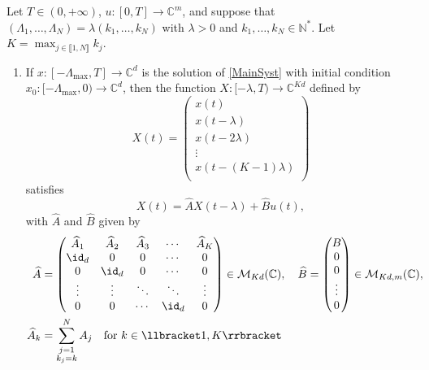 \begin{lemm}
\label{LemmAAugm}
Let $T \in (0, +\infty)$, $u: [0, T] \to \mathbb C^m$, and suppose that $(\Lambda_1, \dots, \Lambda_N) = \lambda (k_1, \dots, k_N)$ with $\lambda > 0$ and $k_1, \dots,  k_N \in \mathbb N^\ast$. Let $K = \max_{j \in \llbracket 1, N\rrbracket} k_j$.
\begin{enumerate}
\item If $x: [-\Lambda_{\max}, T] \to \mathbb C^d$ is the solution of \eqref{MainSyst} with initial condition $x_0: [-\Lambda_{\max}, 0) \to \mathbb C^d$, then the function $X: [-\lambda, T) \to \mathbb C^{K d}$ defined by
\begin{equation}
\label{AugmX}
X(t) = \begin{pmatrix}
x(t) \\
x(t - \lambda) \\
x(t - 2\lambda) \\
\vdots \\
x(t - (K-1)\lambda) \\
\end{pmatrix}
\end{equation}
satisfies
\begin{equation}
\label{AugmSyst}
X(t) = \widehat A X(t - \lambda) + \widehat B u(t),
\end{equation}
with $\widehat A$ and $\widehat B$ given by
\begin{equation}
\label{AugmMat}
\begin{aligned}
\widehat A & = \begin{pmatrix}
\widehat A_1 & \widehat A_2 & \widehat A_3 & \cdots & \widehat A_K \\
\id_d & 0 & 0 & \cdots & 0 \\
0 & \id_d & 0 & \cdots & 0 \\
\vdots & \vdots & \ddots & \ddots & \vdots \\
0 & 0 & \cdots & \id_d & 0 \\
\end{pmatrix} \in \mathcal M_{Kd}(\mathbb C), \quad \widehat B = \begin{pmatrix}
B \\
0 \\
0 \\
\vdots \\
0 \\
\end{pmatrix} \in \mathcal M_{K d, m}(\mathbb C),\\
\widehat A_k & = \sum_{\substack{j = 1 \\ k_j = k}}^N A_j \quad \text{for } k \in \llbracket 1, K\rrbracket\\[-18pt]

\end{aligned}
\end{equation}
\end{enumerate}
\end{lemm}
